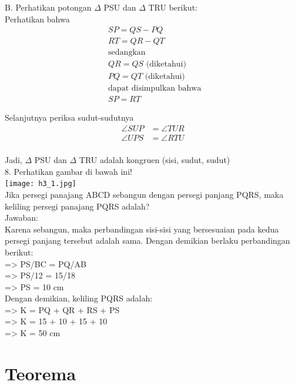 \documentclass[11pt,fleqn]{book} %
\begin{document}
B. Perhatikan potongan $\Delta$ PSU dan $\Delta$ TRU berikut:\\
Perhatikan bahwa\\
    \begin{align*}  	        &SP = QS - PQ \\  		&RT = QR - QT \\  		&\text{sedangkan} \\                 &QR = QS \text{ (diketahui)}\\  		&PQ = QT \text{ (diketahui)}\\                 &\text{dapat disimpulkan bahwa } \\                 &SP = RT 	     \end{align*}

Selanjutnya periksa sudut-sudutnya\\
    \begin{align*}                 \angle SUP &= \angle TUR \\                 \angle UPS &= \angle RTU \\              \end{align*}

Jadi, $\Delta$ PSU dan $\Delta$ TRU adalah kongruen (sisi, sudut, sudut)\\


8. Perhatikan gambar di bawah ini!\\
\texttt{[image: h3\_1.jpg]}\\
Jika persegi panajang ABCD sebangun dengan persegi panjang PQRS, maka keliling persegi panajang PQRS adalah?\\

Jawaban:\\
Karena sebangun, maka perbandingan sisi-sisi yang bersesuaian pada kedua persegi panjang tersebut adalah sama. Dengan demikian berlaku perbandingan berikut:\\
=> PS/BC = PQ/AB\\
=> PS/12 = 15/18\\
=> PS = 10 cm\\
Dengan demikian, keliling PQRS adalah:\\
=> K = PQ + QR + RS + PS\\
=> K = 15 + 10 + 15 + 10\\
=> K = 50 cm\\


\section{Teorema}
\end{document}
